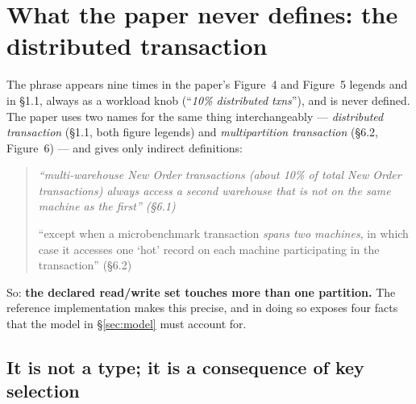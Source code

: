 \documentclass[11pt,a4paper]{article}
\begin{document}
\section{What the paper never defines: the distributed transaction}
\label{sec:whatis}

The phrase appears nine times in the paper's Figure~4 and Figure~5 legends and
in \S1.1, always as a workload knob (``\emph{10\% distributed txns}''), and is
never defined. The paper uses two names for the same thing interchangeably ---
\emph{distributed transaction} (\S1.1, both figure legends) and
\emph{multipartition transaction} (\S6.2, Figure~6) --- and gives only indirect
definitions:

\begin{quote}\small\itshape
``multi-warehouse New Order transactions (about 10\% of total New Order
transactions) \emph{always access a second warehouse that is not on the same
machine as the first}'' (\S6.1)

``except when a microbenchmark transaction \emph{spans two machines}, in which
case it accesses one `hot' record on each machine participating in the
transaction'' (\S6.2)
\end{quote}

So: \textbf{the declared read/write set touches more than one partition.} The
reference implementation makes this precise, and in doing so exposes four
facts that the model in \S\ref{sec:model} must account for.

\subsection{It is not a type; it is a consequence of key selection}
\end{document}
